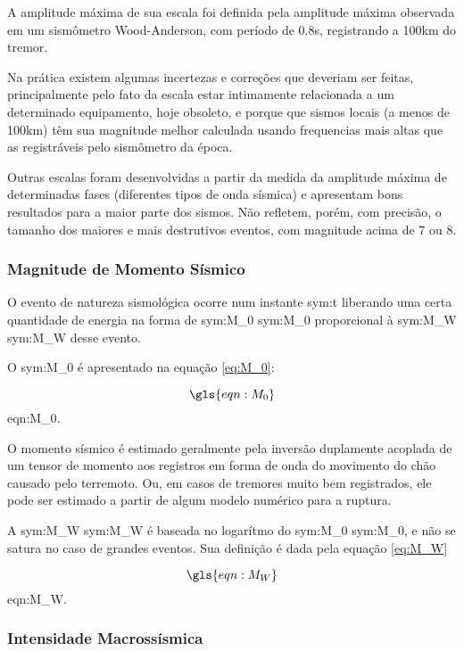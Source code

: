 A amplitude máxima de sua
escala foi definida pela amplitude máxima observada em um sismômetro Wood-Anderson, com período de 0.8s, registrando a 100km 
do tremor.

Na prática existem algumas incertezas e correções que deveriam ser feitas, principalmente pelo fato da escala estar intimamente 
relacionada a um determinado equipamento, hoje obsoleto, e porque que sismos locais (a menos de 100km) têm sua magnitude
melhor calculada usando frequencias mais altas que as registráveis pelo sismômetro da época.


Outras escalas foram desenvolvidas a partir da medida da amplitude máxima de determinadas fases 
(diferentes tipos de onda sísmica) e apresentam bons resultados para a maior parte dos sismos.
Não refletem, porém, com precisão, o tamanho dos maiores e mais destrutivos eventos, com magnitude acima de 7 ou 8.


\subsubsection{Magnitude de Momento Sísmico }
\label{sec:risco_sismico}

O evento de natureza sismológica ocorre num
instante \gls{sym:t} liberando uma certa quantidade de energia na forma de \glsdesc{sym:M_0}
\gls{sym:M_0} proporcional à \glsdesc{sym:M_W} \gls{sym:M_W} desse evento.

O \glsdesc{sym:M_0} é apresentado na equação \ref{eq:M_0}:

\begin{equation}
	\gls{eqn:M_0}
	\label{eq:M_0}
\end{equation}
\glsdesc*{eqn:M_0}.

O momento sísmico é estimado geralmente pela inversão duplamente acoplada de um tensor de momento aos registros em 
forma de onda do movimento do chão causado pelo terremoto. Ou, em casos de tremores muito bem registrados, ele pode
ser estimado a partir de algum modelo numérico para a ruptura.

A \glsdesc{sym:M_W} \gls{sym:M_W} \citep{hanks_1999} é baseada no 
logarítmo do \glsdesc{sym:M_0} \gls{sym:M_0}, e não se satura no caso de grandes eventos. 
Sua definição é dada pela equação \ref{eq:M_W} 

\begin{equation}
	\gls{eqn:M_W}
	\label{eq:M_W}
\end{equation}
\glsdesc*{eqn:M_W}.


\subsubsection{Intensidade Macrossísmica}
\label{sec:intensidade}

